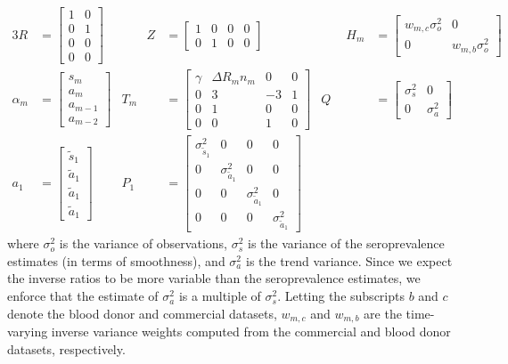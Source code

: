 \documentclass{article}
\begin{document}
\begin{alignat*}{3}
R &= \begin{bmatrix}
1 & 0  \\ 
0 & 1 \\ 
0 & 0 \\ 
0 & 0 
\end{bmatrix} &\qquad 
Z &= \begin{bmatrix}
1 & 0 & 0 & 0 \\ 
0 & 1 & 0 & 0 
\end{bmatrix} &\qquad 
H_m &= \begin{bmatrix} %
w_{m,c}\sigma^2_o & 0 \\ 
0 & w_{m,b}\sigma^2_o
\end{bmatrix} \\
\alpha_m &= \begin{bmatrix}
s_{m}\\
a_m\\ 
a_{m-1}\\ 
a_{m-2}
\end{bmatrix} & 
T_m &= \begin{bmatrix}
 \gamma & \Delta R_mn_m & 0 & 0\\ 
 0 & 3 & -3 & 1 \\ 
 0 & 1 & 0 & 0\\ 
 0 & 0 & 1 & 0
\end{bmatrix}  & 
Q &= \begin{bmatrix} 
\sigma^2_s & 0  \\ 
0 & \sigma^2_a
\end{bmatrix} \\
a_1 &= \begin{bmatrix}
\tilde{s}_{1}\\ 
\tilde{a}_1\\ 
\tilde{a}_1 \\
\tilde{a}_1
\end{bmatrix} & 
P_{1} &= \begin{bmatrix}
\sigma^2_{\tilde{s}_{1}} & 0 & 0 & 0 \\ 
0 & \sigma^2_{\tilde{a}_1} & 0 & 0\\ 
0 & 0 & \sigma^2_{\tilde{a}_1} & 0 \\ 
0 & 0 & 0 & \sigma^2_{\tilde{a}_1}
\end{bmatrix} 
\end{alignat*}
where $\sigma^2_o$ is the variance of observations,
$\sigma^2_s$ is the variance of the seroprevalence estimates (in terms of 
smoothness), and $\sigma^2_a$ is the trend variance. Since we expect the 
inverse ratios to be more variable than the seroprevalence estimates, 
we enforce that the estimate of $\sigma^2_a$ is a multiple of 
$\sigma^2_s$. Letting the subscripts $b$ and $c$ denote
the blood donor and commercial datasets, $w_{m,c}$ and $w_{m,b}$ are the
time-varying inverse variance weights computed from the commercial and blood
donor datasets, respectively. 
\end{document}
